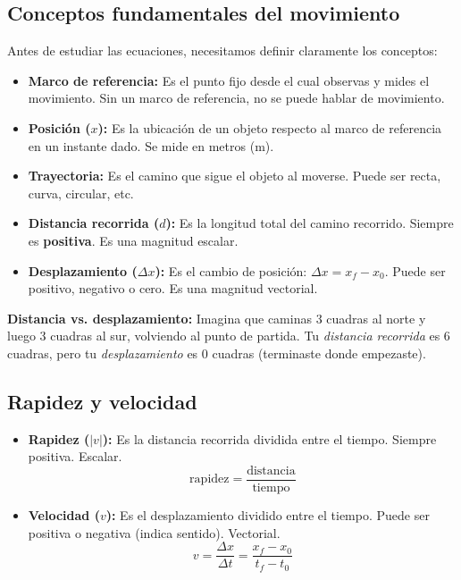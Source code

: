 \documentclass[12pt, letterpaper]{article}
\begin{document}
\subsection{Conceptos fundamentales del movimiento}

Antes de estudiar las ecuaciones, necesitamos definir claramente los conceptos:

\begin{cuadroteoria}
  \begin{itemize}[leftmargin=*]
    \item \textbf{Marco de referencia:} Es el punto fijo desde el cual observas y mides el movimiento. Sin un marco de referencia, no se puede hablar de movimiento.

    \item \textbf{Posición ($x$):} Es la ubicación de un objeto respecto al marco de referencia en un instante dado. Se mide en metros (m).

    \item \textbf{Trayectoria:} Es el camino que sigue el objeto al moverse. Puede ser recta, curva, circular, etc.

    \item \textbf{Distancia recorrida ($d$):} Es la longitud total del camino recorrido. Siempre es \textbf{positiva}. Es una magnitud escalar.

    \item \textbf{Desplazamiento ($\Delta x$):} Es el cambio de posición: $\Delta x = x_f - x_0$. Puede ser positivo, negativo o cero. Es una magnitud vectorial.
  \end{itemize}
\end{cuadroteoria}

\begin{cuadroadvertencia}
  \textbf{Distancia vs. desplazamiento:} Imagina que caminas 3 cuadras al norte y luego 3 cuadras al sur, volviendo al punto de partida. Tu \emph{distancia recorrida} es $6$ cuadras, pero tu \emph{desplazamiento} es $0$ cuadras (terminaste donde empezaste).
\end{cuadroadvertencia}

\newpage

\subsection{Rapidez y velocidad}

\begin{cuadrosolucion}
  \begin{itemize}[leftmargin=*]
    \item \textbf{Rapidez ($|v|$):} Es la distancia recorrida dividida entre el tiempo. Siempre positiva. Escalar.
          $$\text{rapidez} = \frac{\text{distancia}}{\text{tiempo}}$$

    \item \textbf{Velocidad ($v$):} Es el desplazamiento dividido entre el tiempo. Puede ser positiva o negativa (indica sentido). Vectorial.
          $$v = \frac{\Delta x}{\Delta t} = \frac{x_f - x_0}{t_f - t_0}$$
  \end{itemize}
\end{cuadrosolucion}
\end{document}

